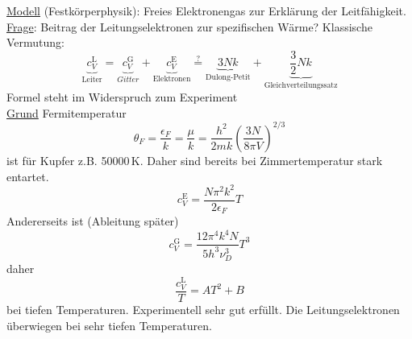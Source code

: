 \begin{enumerate}[A)]
    \underline{Modell} (Festkörperphysik): Freies Elektronengas zur Erklärung der Leitfähigkeit.\\
    \underline{Frage}: Beitrag der Leitungselektronen zur spezifischen Wärme? Klassische Vermutung:
    \begin{equation}
        \underbrace{c_V^\text{L}}_{\text{Leiter}} = \underbrace{c_V^\text{G}}_{Gitter} + \underbrace{c_V^\text{E}}_{\text{Elektronen}} \overset{?}{=} \underbrace{3 N k}_{\text{Dulong-Petit}} + \underbrace{\frac{3}{2} N k}_{\text{Gleichverteilungssatz}}
    \end{equation}
    Formel steht im Widerspruch zum Experiment \\
    \underline{Grund} Fermitemperatur
    \begin{equation}
        \theta_F = \frac{\epsilon_F}{k} = \frac{\mu}{k} = \frac{h^2}{2 m k} \left( \frac{3 N}{8 \pi V} \right)^{2/3}
    \end{equation}
    ist für Kupfer z.B. 50000$\,$K. Daher sind bereits bei Zimmertemperatur stark entartet.
    \begin{equation}
        c_V^\text{E} = \frac{N \pi^2 k^2}{2 \epsilon_F} T
    \end{equation}
    Andererseits ist (Ableitung später)
    \begin{equation}
        c_V^\text{G} = \frac{12 \pi^4 k^4 N}{5 h^3 \nu_D^3} T^3
    \end{equation}
    daher
    \begin{equation}
        \frac{c_V^\text{L}}{T} = A T^2 + B
    \end{equation}
    bei tiefen Temperaturen. Experimentell sehr gut erfüllt. Die Leitungselektronen überwiegen bei sehr tiefen Temperaturen.
    

\end{enumerate}
